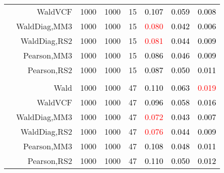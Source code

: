 \documentclass[
]{article}
\begin{document}
\begin{table}[H]
{\begin{tabular}[t]{lrrrrrrr}
\hspace{1em} & WaldVCF & 1000 & 1000 & 15 & \textcolor{black}{0.107} & \textcolor{black}{0.059} & \textcolor{black}{0.008}\\

\hspace{1em} & WaldDiag,MM3 & 1000 & 1000 & 15 & \textcolor{red}{0.080} & \textcolor{black}{0.042} & \textcolor{black}{0.006}\\

\hspace{1em} & WaldDiag,RS2 & 1000 & 1000 & 15 & \textcolor{red}{0.081} & \textcolor{black}{0.044} & \textcolor{black}{0.009}\\

\hspace{1em} & Pearson,MM3 & 1000 & 1000 & 15 & \textcolor{black}{0.086} & \textcolor{black}{0.046} & \textcolor{black}{0.009}\\

\hspace{1em} & Pearson,RS2 & 1000 & 1000 & 15 & \textcolor{black}{0.087} & \textcolor{black}{0.050} & \textcolor{black}{0.011}\\
\cmidrule{1-8}
\addlinespace[0.3em]
\multicolumn{8}{l}{\textbf{3F 15V}}\\
\hspace{1em} & Wald & 1000 & 1000 & 47 & \textcolor{black}{0.110} & \textcolor{black}{0.063} & \textcolor{red}{0.019}\\

\hspace{1em} & WaldVCF & 1000 & 1000 & 47 & \textcolor{black}{0.096} & \textcolor{black}{0.058} & \textcolor{black}{0.016}\\

\hspace{1em} & WaldDiag,MM3 & 1000 & 1000 & 47 & \textcolor{red}{0.072} & \textcolor{black}{0.043} & \textcolor{black}{0.007}\\

\hspace{1em} & WaldDiag,RS2 & 1000 & 1000 & 47 & \textcolor{red}{0.076} & \textcolor{black}{0.044} & \textcolor{black}{0.009}\\

\hspace{1em} & Pearson,MM3 & 1000 & 1000 & 47 & \textcolor{black}{0.108} & \textcolor{black}{0.048} & \textcolor{black}{0.011}\\

\hspace{1em} & Pearson,RS2 & 1000 & 1000 & 47 & \textcolor{black}{0.110} & \textcolor{black}{0.050} & \textcolor{black}{0.012}\\
\bottomrule
\end{tabular}}
\endgroup{}
\end{table}
\end{document}
